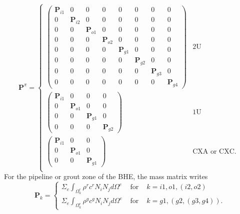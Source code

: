 \begin{equation}
\bm{P}^\pi = \left\{ \begin{array}{ll}
\left( \begin{array}{cccccccc}
\bm{P}_{i1} & 0 & 0 & 0 & 0 & 0 & 0 & 0 \\
0 & \bm{P}_{i2} & 0 & 0 & 0 & 0 & 0 & 0 \\
0 & 0 & \bm{P}_{o1} & 0 & 0 & 0 & 0 & 0 \\
0 & 0 & 0 & \bm{P}_{o2} & 0 & 0 & 0 & 0 \\
0 & 0 & 0 & 0 & \bm{P}_{g1} & 0 & 0 & 0 \\
0 & 0 & 0 & 0 & 0 & \bm{P}_{g2} & 0 & 0 \\
0 & 0 & 0 & 0 & 0 & 0 & \bm{P}_{g3} & 0 \\
0 & 0 & 0 & 0 & 0 & 0 & 0 & \bm{P}_{g4} \end{array} \right)
  & \mbox{2U} \\
\left( \begin{array}{cccc}
\bm{P}_{i1} & 0 & 0 & 0  \\
0 & \bm{P}_{o1} & 0 & 0  \\
0 & 0 & \bm{P}_{g1} & 0  \\
0 & 0 & 0 & \bm{P}_{g2}  \end{array} \right)
 & \mbox{1U} \\
\left( \begin{array}{ccc}
\bm{P}_{i1} & 0 & 0  \\
0 & \bm{P}_{o1} & 0  \\
0 & 0 & \bm{P}_{g1}  \end{array} \right)
 & \mbox{CXA or CXC. } \\
       \end{array} \right.
\end{equation}
For the pipeline or grout zone of the BHE, the mass matrix writes
\begin{equation}
\bm{P}_k = \left\{ \begin{array}{rcl}
\Sigma_{e} \int_{\Omega_k^e} \rho^r c^r N_i N_j d\Omega^e 
   &\mbox{~for~}& k = i1, o1, (i2, o2) \\
\Sigma_{e} \int_{\Omega_k^e} \rho^g c^g N_i N_j d\Omega^e 
   &\mbox{~for~}& k = g1, (g2, (g3, g4)). 
       \end{array} \right.
\end{equation}
